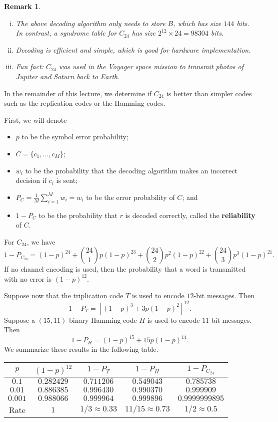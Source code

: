 \documentclass[10pt]{article}
\theoremstyle{newstyle}
\newtheorem{remark}[thm]{Remark}
\begin{document}
\begin{remark}~
\begin{enumerate}[(i)]
    \item The above decoding algorithm only needs to store $B$, which has size $144$ bits. 
    In contrast, a syndrome table for $C_{24}$ has size $2^{12} \times 24 = 98304$ bits. 
    \item Decoding is efficient and simple, which is good for hardware implementation.
    \item Fun fact: $C_{24}$ was used in the Voyager space mission to transmit photos of 
    Jupiter and Saturn back to Earth.
\end{enumerate}
\end{remark}

In the remainder of this lecture, we determine if $C_{24}$ is better than simpler codes such as 
the replication codes or the Hamming codes. 

First, we will denote
\begin{itemize}
    \item $p$ to be the symbol error probability;
    \item $C = \{c_1, \dots, c_M\}$;
    \item $w_i$ to be the probability that the decoding algorithm makes an incorrect decision if 
    $c_i$ is sent;
    \item $P_C = \frac1M \sum_{i=1}^M w_i = w_i$ to be the error probability of $C$; and 
    \item $1 - P_C$ to be the probability that $r$ is decoded correctly, called the 
    {\bf reliability} of $C$. 
\end{itemize}
For $C_{24}$, we have 
\[ 1 - P_{C_{24}} = (1-p)^{24} + \binom{24}1 p(1-p)^{23} + \binom{24}2 p^2(1-p)^{22} + 
\binom{24}3 p^3(1-p)^{21}. \]
If no channel encoding is used, then the probability that a word is transmitted with no error is 
$(1-p)^{12}$. 

Suppose now that the triplication code $T$ is used to encode $12$-bit messages. Then 
\[ 1 - P_T = \left[ (1-p)^3 + 3p(1-p)^2 \right]^{12}. \]
Suppose a $(15, 11)$-binary Hamming code $H$ is used to encode $11$-bit messages. Then 
\[ 1 - P_H = (1-p)^{15} + 15p(1-p)^{14}. \]
We summarize these results in the following table. 

\begin{table}[h]
\centering
\begin{tabular}{|c|c|c|c|c|}
\hline
$p$     & $(1-p)^{12}$ & $1-P_T$            & $1-P_H$              & $1-P_{C_{24}}$    \\ \hline
$0.1$   & $0.282429$   & $0.711206$         & $0.549043$           & $0.785738$        \\ \hline
$0.01$  & $0.886385$   & $0.996430$         & $0.990370$           & $0.999909$        \\ \hline
$0.001$ & $0.988066$   & $0.999964$         & $0.999896$           & $0.9999999895$    \\ \hline
Rate    & $1$          & $1/3 \approx 0.33$ & $11/15 \approx 0.73$ & $1/2 \approx 0.5$ \\ \hline
\end{tabular}
\end{table}
\end{document}
